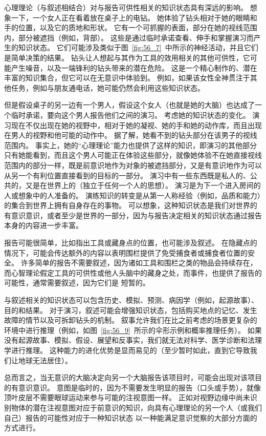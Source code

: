 心理理论（与叙述相结合）对与报告可供性相关的知识状态具有深远的影响。
想象一下，一个女人正在看着放在桌子上的电钻。
她体验了钻头相对于她的眼睛和手的位置，以及它的质地和形状。
它有一个可抓握的表面，部分在她的视线范围内，部分被遮挡（例如，背部）。
这些是通过临时承诺查看、伸手和掌握演习而产生的知识状态。
它们可能涉及类似于图~\ref{fig:56_7}~中所示的神经活动，并且它们是简单决策的结果。
钻头让人想起与其作为工具的效用相关的其他可供性，它可能产生噪音，以及一端锋利的钻头带来的潜在危险。
这是一个精心制作的、潜在丰富的知识集合，但它可以在无意识中体验到。
例如，如果该女性全神贯注于其他任务，例如与朋友通电话，她可能仍然会利用这些知识状态。


但是假设桌子的另一边有一个男人，假设这个女人（也就是她的大脑）也达成了一个临时承诺，要向这个男人报告他们之间的演习。
考虑她的知识状态的变化。
演习现在不仅出现在她的视野中，相对于她的凝视、她的手和她的动作库，而且出现在男人的视野和他可能的动作中。
据了解，她看不到的钻头部分在该男子的视线范围内。
事实上，她的“心理理论”能力也提供了这样的知识，即演习的其他部分只有她能看到，而且这个男人可能正在体验这些部分，就像她体验不在她直接视线范围内的部分一样，既是前意识地作为对象的被遮挡部分，又是有意识地作为可以从另一个有利位置直接看到的目标的一部分。
演习中有一些东西既是私人的、公共的，又是在世界上的（独立于任何一个人的思想）。
演习是为下一个进入房间的人或想象中的人准备的。
演练知识的转变是从第一人称经验（例如，品质和能力）的集合到世界上拥有自身存在的事物。
可以想象，这种知识状态是我们对世界的有意识意识，或者至少是世界的一部分，因为与报告决定相关的知识状态通过报告本身的内容进一步丰富。


报告可能很简单，比如指出工具或藏身点的位置，也可能涉及叙述。
在隐藏点的情况下，可能会传达额外的内容以表明围栏提供了免受捕食者或捕食者位置的安全。
许多简单的报告不需要叙述，因为诸如工具和围栏之类的物品会持续存在，而心智理论假定工具的可供性或他人头脑中的藏身之处，而事件，也提供了报告的可能性，通常需要叙述，因为它们是 短暂的。


与叙述相关的知识状态可以包含历史、模拟、预测、病因学（例如，起源故事）、目的和结果。
对于演习，叙述可能会增强知识状态，包括购买地点的记忆、发生故障的情节以及可拆卸钻头的机制。
叙事允许我们在比之前考虑的场景更复杂的环境中进行推理（例如，如图~\ref{fig:56_9}~所示的伞形示例和概率推理任务）。
如果没有起源故事、模拟、假设、展望和反事实，我们就无法对科学、医学诊断和法理学进行推理。
这种能力的进化优势是显而易见的（至少暂时如此，直到它导致我们让地球无法居住）。


总而言之，当无意识的大脑决定向另一个大脑报告该项目时，可能会出现对该项目的有意识意识。
意图是临时的，因为不需要发生明显的报告（口头或手势），就像顶叶皮层不需要眼球运动来参与可能的注视意图一样。
正如对视野边缘中尚未识别物体的潜在注视意图对应于前意识的知识，向具有心理理论的另一个人（或我们自己）报告的可能性对应于一种知识状态 以一种能满足意识觉察的大部分方面的方式进行。


